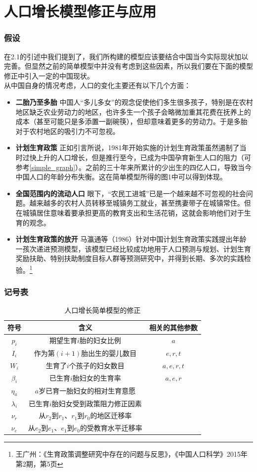 \documentclass[a4paper]{article}
\begin{document}
\part{人口增长模型修正与应用}
\section{假设}
在2.1的引述中我们提到了，我们所构建的模型应该要结合中国当今实际现状加以完善。但显然之前的简单模型中并没有考虑到这些因素，所以我们要在下面的模型修正中引入一定的中国现状。\\
\indent
从中国自身的情况考虑，人口的变化主要还有以下几个方面：
\begin{itemize} 
\item \textbf{二胎乃至多胎} 中国人“多儿多女”的观念促使他们多生很多孩子，特别是在农村地区缺乏农业劳动力的地区，也许多生一个孩子会略微加重其花费在抚养上的成本（甚至可能只是多添置一副碗筷），但却意味着更多的劳动力。于是多胎对于农村地区的吸引力不可忽视。
\item \textbf{计划生育政策} 正如引言所说，1981年开始实施的计划生育政策虽然遏制了当时过快上升的人口增长，但是推行至今，已成为中国孕育新生人口的阻力（可参考\ref{simple_graph}）。之前的三十年来所累计的少出生的四亿人口，导致当今中国人口的年龄分布失衡。这在简单模型所得的图1中可以得到体现。
\item \textbf{全国范围内的流动人口} 眼下，“农民工进城”已是一个越来越不可忽视的社会问题。越来越多的农村人员转移至城镇务工就业，甚至携妻带子在城镇常住。但在城镇居住意味着要承担更高的教育支出和生活花销，这就会影响他们对于生育的观念。
\item \textbf{计划生育政策的放开} 马瀛通等（1986）针对中国计划生育政策实践提出年龄一孩次递进预测模型，该模型已经比较成功地用于人口预测与规划、计划生育奖励扶助、特别扶助制度目标人群等预测研究中，并得到长期、多次的实践检验。\footnote{王广州：《生育政策调整研究中存在的问题与反思》，《中国人口科学》2015年第2期，第5页}
\end{itemize}
\section{记号表}
	\begin{table}[H]
		\centering
		\caption{人口增长简单模型的修正}
		\label{amend_symbol}
		\begin{tabular}{ccc}
			\hline
			符号				&	含义																&	相关的其他参数	\\
			\hline
			$p_i$				&	期望生育$i$胎的妇女比例							&	$a$			\\
			$I_i$				&	作为第$(i+1)$胎出生的婴儿数目				&	$e,r,t$		\\
			$W_i$				&	生育了$i$个孩子的妇女数目						&	$a,e,r,t$	\\
			$\beta_i$		&	已生育$i$胎妇女的生育率							&	$a,e,r$	\\
			$\eta_a$		&	$a$岁已育一胎妇女的相对生育意愿			&	\\
			$\lambda_i$	&	已生育$i$胎妇女受到政策阻力修正因素	&	\\
			$\nu_r$	&	从$r_2$到$r_1$、$r_1$到$r_0$的地区迁移率				& \\
			$\nu_e$	&	从$e_2$到$e_1$、$e_1$到$e_0$的受教育水平迁移率	& \\
			\hline
		\end{tabular}
	\end{table}
\end{document}
